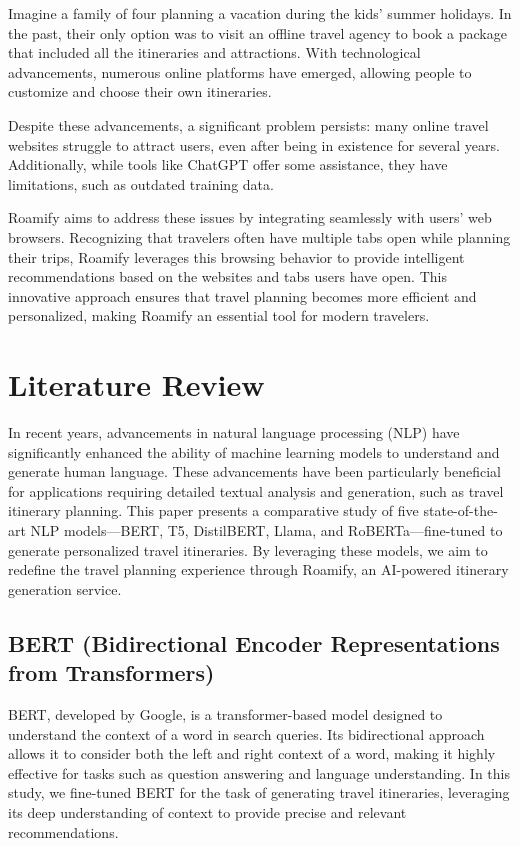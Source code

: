 \documentclass[conference]{IEEEtran}
\begin{document}
Imagine a family of four planning a vacation during the kids' summer holidays. In the past, their only option was to visit an offline travel agency to book a package that included all the itineraries and attractions. With technological advancements, numerous online platforms have emerged, allowing people to customize and choose their own itineraries.

Despite these advancements, a significant problem persists: many online travel websites struggle to attract users, even after being in existence for several years. Additionally, while tools like ChatGPT offer some assistance, they have limitations, such as outdated training data.

Roamify aims to address these issues by integrating seamlessly with users' web browsers. Recognizing that travelers often have multiple tabs open while planning their trips, Roamify leverages this browsing behavior to provide intelligent recommendations based on the websites and tabs users have open. This innovative approach ensures that travel planning becomes more efficient and personalized, making Roamify an essential tool for modern travelers.

\section{Literature Review}

In recent years, advancements in natural language processing (NLP) have significantly enhanced the ability of machine learning models to understand and generate human language. These advancements have been particularly beneficial for applications requiring detailed textual analysis and generation, such as travel itinerary planning. This paper presents a comparative study of five state-of-the-art NLP models—BERT, T5, DistilBERT, Llama, and RoBERTa—fine-tuned to generate personalized travel itineraries. By leveraging these models, we aim to redefine the travel planning experience through Roamify, an AI-powered itinerary generation service.

\subsection{BERT (Bidirectional Encoder Representations from Transformers)}
BERT, developed by Google, is a transformer-based model designed to understand the context of a word in search queries. Its bidirectional approach allows it to consider both the left and right context of a word, making it highly effective for tasks such as question answering and language understanding. In this study, we fine-tuned BERT for the task of generating travel itineraries, leveraging its deep understanding of context to provide precise and relevant recommendations.
\end{document}
